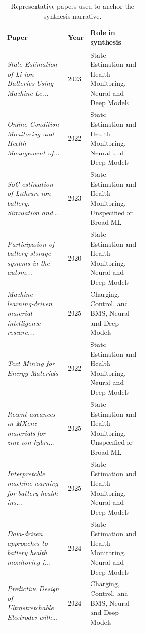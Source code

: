 \documentclass[journal]{IEEEtran}
\begin{document}
\begin{table}[t]
\caption{Representative papers used to anchor the synthesis narrative.}
\label{tab:synthesis_anchors}
\centering
\footnotesize
\begin{tabularx}{\linewidth}{p{0.44\linewidth} p{0.12\linewidth} X}
\toprule
Paper & Year & Role in synthesis \\
\midrule
\textit{State Estimation of Li-ion Batteries Using Machine Le...} \cite{stateestimationof2023} & 2023 & State Estimation and Health Monitoring, Neural and Deep Models \\
\textit{Online Condition Monitoring and Health Management of...} \cite{onlineconditionmonitorin2022} & 2022 & State Estimation and Health Monitoring, Neural and Deep Models \\
\textit{SoC estimation of Lithium-ion battery: Simulation and...} \cite{socestimationof2023} & 2023 & State Estimation and Health Monitoring, Unspecified or Broad ML \\
\textit{Participation of battery storage systems in the autom...} \cite{participationofbattery2020} & 2020 & State Estimation and Health Monitoring, Neural and Deep Models \\
\textit{Machine learning-driven material intelligence researc...} \cite{machinelearningdriven2025} & 2025 & Charging, Control, and BMS, Neural and Deep Models \\
\textit{Text Mining for Energy Materials} \cite{textminingfor2022} & 2022 & State Estimation and Health Monitoring, Neural and Deep Models \\
\textit{Recent advances in MXene materials for zinc-ion hybri...} \cite{recentadvancesin2025} & 2025 & State Estimation and Health Monitoring, Unspecified or Broad ML \\
\textit{Interpretable machine learning for battery health ins...} \cite{interpretablemachinelear2025} & 2025 & State Estimation and Health Monitoring, Neural and Deep Models \\
\textit{Data-driven approaches to battery health monitoring i...} \cite{datadrivenapproaches2024} & 2024 & State Estimation and Health Monitoring, Neural and Deep Models \\
\textit{Predictive Design of Ultrastretchable Electrodes with...} \cite{predictivedesignof2024} & 2024 & Charging, Control, and BMS, Neural and Deep Models \\
\bottomrule
\end{tabularx}
\end{table}
\end{document}
